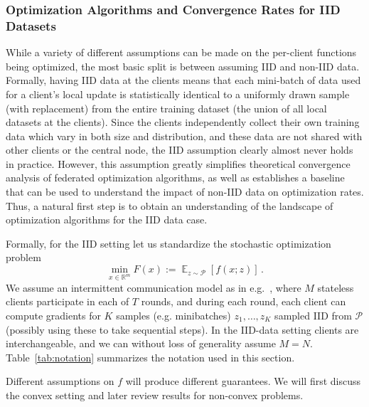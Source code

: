 \documentclass[11pt]{article}
\newcommand{\R}{\mathbb{R}}
\DeclareMathOperator*{\E}{\mathbb{E}}
\begin{document}
\subsubsection{Optimization Algorithms and Convergence Rates for IID Datasets}
\label{sec:iid}

While a variety of different assumptions can be made on the per-client functions being optimized, the most basic split is between assuming IID and non-IID data. Formally, having IID data at the clients means that each mini-batch of data used for a client's local update is statistically identical to a uniformly drawn sample (with replacement) from the entire training dataset (the union of all local datasets at the clients). Since the clients independently collect their own training data which vary in both size and distribution, and these data are not shared with other clients or the central node, the IID assumption clearly almost never holds in practice. However, this assumption greatly simplifies theoretical convergence analysis of federated optimization algorithms, as well as establishes a baseline that can be used to understand the impact of non-IID data on optimization rates. Thus, a natural first step is to obtain an understanding of the landscape of optimization algorithms for the IID data case.


\noindent Formally, for the IID setting let us standardize the stochastic optimization problem
\[ 
   \min_{x \in \R^m} F(x) := \E_{z \sim \mathcal{P}} [f(x; z)] \,.
\]
We assume an intermittent communication model as in e.g.\ \citet[Sec. 4.4]{woodworth18graphoracle}, where $M$ stateless clients participate in each of $T$ rounds, and during each round, each client can compute gradients for $K$ samples (e.g. minibatches) $z_1, \dots, z_K$ sampled IID from $\mathcal{P}$ (possibly using these to take sequential steps). In the IID-data setting clients are interchangeable, and we can without loss of generality assume $M=N$. Table~\ref{tab:notation} summarizes the notation used in this section.

Different assumptions on $f$ will produce different guarantees. We will first discuss the convex setting and later review results for  non-convex problems.
\end{document}

